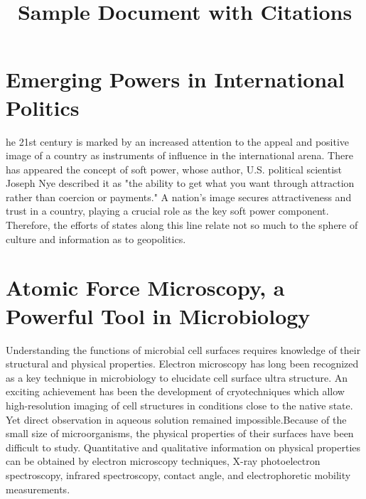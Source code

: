 \documentclass{article}
\begin{document}
	
	\title{Sample Document with Citations}
	\author{}
	\date{}
	\maketitle
	
	\section{Emerging Powers in International Politics}
	  he 21st century is marked by an increased attention to the appeal and positive image of a country as instruments of influence in the international arena\cite{bohomolov2012ghost}. There has appeared the concept of soft power, whose author, U.S\cite{sergunin2015understanding}. political scientist Joseph Nye described it as "the ability to get what you want through attraction rather than coercion or payments\cite{hill2006moscow}." A nation's image secures attractiveness and trust in a country, playing a crucial role as the key soft power component\cite{kiseleva2015russia}. Therefore, the efforts of states along this line relate not so much to the sphere of culture and information as to geopolitics\cite{kosachev2012spsecific}.
	
	
	\section{Atomic Force Microscopy, a Powerful Tool in Microbiology}
      Understanding the functions of microbial cell surfaces requires knowledge of their structural and physical properties\cite{dufrene2002atomic}. Electron microscopy has long been recognized as a key technique in microbiology to elucidate cell surface ultra structure\cite{engel1999atomic}. An exciting achievement has been the development of cryotechniques which allow high-resolution imaging of cell structures in conditions close to the native state\cite{franz2008atomic}. Yet direct observation in aqueous solution remained impossible.Because of the small size of microorganisms, the physical properties of their surfaces have been difficult to study\cite{marrese2017atomic}. Quantitative and qualitative information on physical properties can be obtained by electron microscopy techniques, X-ray photoelectron spectroscopy, infrared spectroscopy, contact angle, and electrophoretic mobility measurements\cite{altman2015noncontact}. 
	
	
	
	
\end{document}
